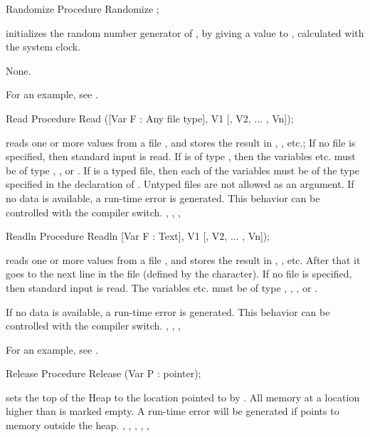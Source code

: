\documentclass{report}
\begin{document}
\html{}
\begin{procedure}{Randomize}
\Declaration
Procedure Randomize ;

\Description
{} initializes the random number generator of \fpc, by giving
a value to , calculated with the system clock.

\Errors
None.
\SeeAlso
{}
\end{procedure}
For an example, see .
\begin{procedure}{Read}
\Declaration
Procedure Read ([Var F : Any file type], V1 [, V2, ... , Vn]);

\Description
{} reads one or more values from a file , and stores the
result in , , etc.; If no file  is specified, then
standard input is read.
If  is of type , then the variables  etc. must be
of type , ,  or .
If  is a typed file, then each of the variables must be of the type
specified in the declaration of . Untyped files are not allowed as an
argument.
\Errors
If no data is available, a run-time error is generated. This behavior can
be controlled with the  compiler switch.
\SeeAlso
{}, , , 
\end{procedure}
\html{}
\begin{procedure}{Readln}
\Declaration
Procedure Readln [Var F : Text], V1 [, V2, ... , Vn]);

\Description
{} reads one or more values from a file , and stores the
result in , , etc. After that it goes to the next line in
the file (defined by the  character).
If no file  is specified, then standard input is read.
The variables  etc. must be of type , ,
,  or .

\Errors
If no data is available, a run-time error is generated. This behavior can
be controlled with the  compiler switch.
\SeeAlso
{}, , , 
\end{procedure}
For an example, see .
\begin{procedure}{Release}
\Declaration
Procedure Release (Var P : pointer);

\Description
{} sets the top of the Heap to the location pointed to by
. All memory at a location higher than  is marked empty.
\Errors
A run-time error will be generated if  points to memory outside the
heap.
\SeeAlso
{}, , , , 
, 
\end{procedure}
\end{document}
